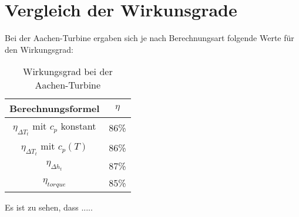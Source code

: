 \section{Vergleich der Wirkunsgrade}
Bei der Aachen-Turbine ergaben sich je nach Berechnungsart folgende Werte für den Wirkungsgrad:
\begin{table}[H]
	\centering
	\caption{Wirkungsgrad bei der Aachen-Turbine}
	\begin{tabular}{ c| c}
		Berechnungsformel & $\eta$ \\
		\hline
		$\eta_{\Delta T_t}$ mit $c_p$ konstant& 86\% \\
		$\eta_{\Delta T_t}$ mit $c_p(T)$& 86\% \\
		$\eta_{\Delta h_t}$& 87\% \\
		$\eta_{torque}$& 85\% \\
	\end{tabular}
	\label{tab:wgaachen}
\end{table}
Es ist zu sehen, dass .....
\todo